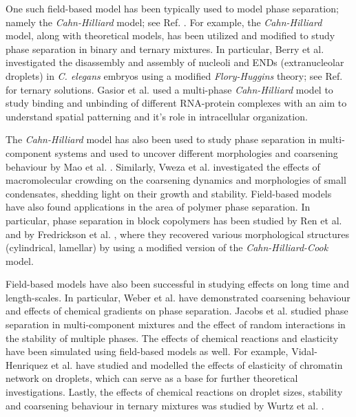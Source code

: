 One such field-based model has been typically used to model phase separation; namely the \textit{Cahn-Hilliard} model; see Ref. \cite{CahnHilliardEq}.
For example, the \textit{Cahn-Hilliard} model, along with theoretical models, has been utilized and modified to study phase separation in binary and ternary mixtures.
In particular, Berry et al. \cite{Berry2015} investigated the disassembly and assembly of nucleoli and ENDs (extranucleolar droplets) in \textit{C. elegans} embryos using a modified \textit{Flory-Huggins} theory; see Ref. \cite{FloryBook} for ternary solutions.
Gasior et al. \cite{Gasior2019} used a multi-phase \textit{Cahn-Hilliard} model to study binding and unbinding of different RNA-protein complexes with an aim to understand spatial patterning and it's role in intracellular organization.

The \textit{Cahn-Hilliard} model has also been used to study phase separation in multi-component systems and used to uncover different morphologies and coarsening behaviour by Mao et al. \cite{Mao2019}.
Similarly, Vweza et al. \cite{ijms22136675} investigated the effects of macromolecular crowding on the coarsening dynamics and morphologies of small condensates, shedding light on their growth and stability.
Field-based models have also found applications in the area of polymer phase separation.
In particular, phase separation in block copolymers has been studied by Ren et al. \cite{Ren2001} and by Fredrickson et al. \cite{Fredrickson2002}, where they recovered various morphological structures (cylindrical, lamellar) by using a modified version of the \textit{Cahn-Hilliard-Cook} model.

Field-based models have also been successful in studying effects on long time and length-scales.
In particular, Weber et al. \cite{Review2019,Weber2017} have demonstrated coarsening behaviour and effects of chemical gradients on phase separation. 
Jacobs et al. \cite{Jacobs2021,JACOBS2017683}
studied phase separation in multi-component mixtures and the effect of random interactions in the stability of multiple phases.  
The effects of chemical reactions and elasticity have been simulated using field-based models as well.
For example, Vidal-Henriquez et al. \cite{VidalHenriquez2021} have studied and modelled the effects of elasticity of chromatin network on droplets, which can serve as a base for further theoretical investigations.
Lastly, the effects of chemical reactions on droplet sizes, stability and coarsening behaviour in ternary mixtures was studied by Wurtz et al. \cite{Wurtz2018}.

